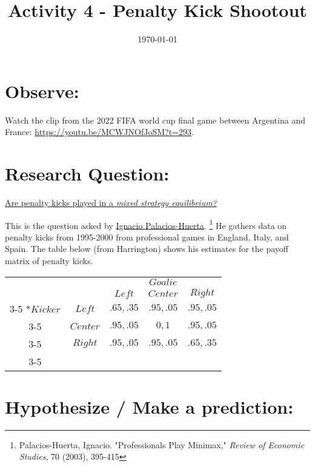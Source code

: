 \documentclass[12pt]{exam}
\title{Activity 4 - Penalty Kick Shootout}
\date{\today}
\begin{document}
    
\section*{Observe:}

Watch the clip from the 2022 FIFA world cup final game between Argentina and France:
\url{https://youtu.be/MCWJNOfJoSM?t=293}.

\section*{Research Question:}

\underline{Are penalty kicks played in a \textit{mixed strategy equilibrium?}}

This is the question asked by \href{http://www.palacios-huerta.com/docs/professionals.pdf}{Ignacio Palacios-Huerta}.
\footnote{Palacios-Huerta, Ignacio. "Professionals Play Minimax," \textit{Review of Economic Studies}, 70 (2003), 395-415}
He gathers data on penalty kicks from 1995-2000 from professional games in England, Italy, and Spain.
The table below (from Harrington) shows his estimates for the payoff matrix of penalty kicks.

\begin{center}
  \begin{tabular}{cc|c|c|c|}
    & \multicolumn{1}{c}{} & \multicolumn{3}{c}{ $Goalie$} \\ 
    & \multicolumn{1}{c}{} & { $Left$} & { $Center$} & { $Right$} \\ \cline{3-5}
     \multirow{3}*{$Kicker$} & $Left$    &$ .65, .35$ &$ .95, .05$ &$ .95, .05$ \\ \cline{3-5}
                              & $Center$ &$ .95, .05$ &$   0,   1$ &$ .95, .05$ \\ \cline{3-5}
                              & $Right$  &$ .95, .05$ &$ .95, .05$ &$ .65, .35$  \\ \cline{3-5} 
\end{tabular}
\end{center}

\section*{Hypothesize / Make a prediction:}
\end{document}
